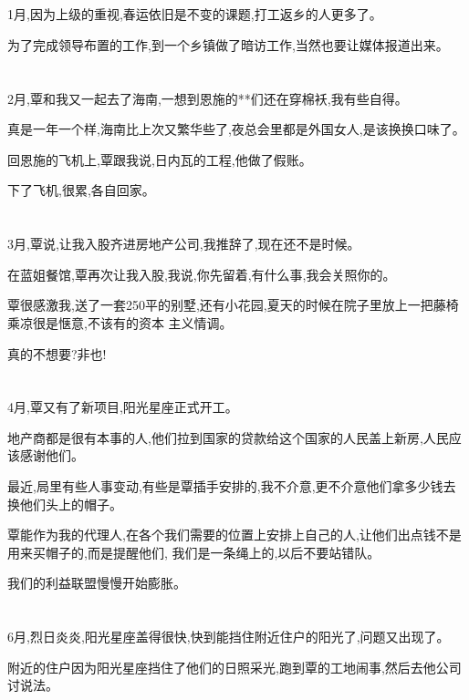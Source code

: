 \documentclass[11pt]{article}
\begin{document}
\section{}
1月,因为上级的重视,春运依旧是不变的课题,打工返乡的人更多了。

为了完成领导布置的工作,到一个乡镇做了暗访工作,当然也要让媒体报道出来。

\section{}
2月,覃和我又一起去了海南,一想到恩施的**们还在穿棉袄,我有些自得。

真是一年一个样,海南比上次又繁华些了,夜总会里都是外国女人,是该换换口味了。

回恩施的飞机上,覃跟我说,日内瓦的工程,他做了假账。

下了飞机,很累,各自回家。

\section{}
3月,覃说,让我入股齐进房地产公司,我推辞了,现在还不是时候。

在蓝姐餐馆,覃再次让我入股,我说,你先留着,有什么事,我会关照你的。

覃很感激我,送了一套250平的别墅,还有小花园,夏天的时候在院子里放上一把藤椅乘凉很是惬意,不该有的资本
主义情调。

真的不想要?非也!



\section{}
4月,覃又有了新项目,阳光星座正式开工。

地产商都是很有本事的人,他们拉到国家的贷款给这个国家的人民盖上新房,人民应该感谢他们。

最近,局里有些人事变动,有些是覃插手安排的,我不介意,更不介意他们拿多少钱去换他们头上的帽子。

覃能作为我的代理人,在各个我们需要的位置上安排上自己的人,让他们出点钱不是用来买帽子的,而是提醒他们,
我们是一条绳上的,以后不要站错队。

我们的利益联盟慢慢开始膨胀。

\section{}
6月,烈日炎炎,阳光星座盖得很快,快到能挡住附近住户的阳光了,问题又出现了。

附近的住户因为阳光星座挡住了他们的日照采光,跑到覃的工地闹事,然后去他公司讨说法。
\end{document}
